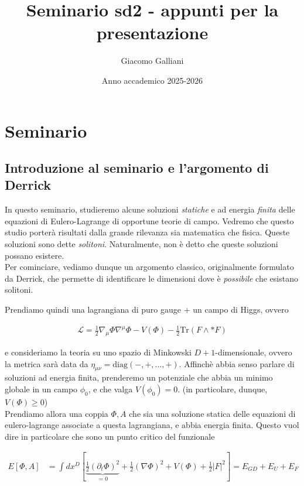 \documentclass{report}
\title{\Huge{\textbf{Seminario sd2 - appunti per la presentazione}}}
\author{Giacomo Galliani}
\date{Anno accademico 2025-2026}
\begin{document}
\maketitle
\newpage

\chapter{Seminario}

\section{Introduzione al seminario e l'argomento di Derrick}

In questo seminario, studieremo alcune soluzioni \emph{statiche} e ad energia \emph{finita} delle equazioni di Eulero-Lagrange di opportune teorie di campo. Vedremo che questo studio porterà risultati dalla grande rilevanza sia matematica che fisica. Queste soluzioni sono dette \emph{solitoni}. Naturalmente, non è detto che queste soluzioni possano esistere. \\

Per cominciare, vediamo dunque un argomento classico, originalmente formulato da Derrick, che permette di identificare le dimensioni dove è \emph{possibile} che esistano solitoni. 

Prendiamo quindi una lagrangiana di puro gauge + un campo di Higgs, ovvero 

\begin{align}
    \mathcal{L} = \frac{1}{2}\nabla_\mu \Phi \nabla^\mu \Phi - V(\Phi) - \frac{1}{2}\text{Tr}(F \wedge *F)
\end{align}

e consideriamo la teoria su uno spazio di Minkowski \(D+1\)-dimensionale, ovvero la metrica sarà data da \(\eta_{\mu\nu} = \text{diag}(-, +, \ldots, +)\). Affinchè abbia senso parlare di soluzioni ad energia finita, prenderemo un potenziale che abbia un minimo globale in un campo \(\phi_0\), e che valga \(V(\phi_0) = 0\). (in particolare, dunque, \(V(\Phi) \geq 0\))\\

Prendiamo allora una coppia \(\Phi, A\) che sia una soluzione statica delle equazioni di eulero-lagrange associate a questa lagrangiana, e abbia energia finita. Questo vuol dire in particolare che sono un punto critico del funzionale 

\begin{align}
    E [\Phi, A] &= \int dx^D \left[ \underbrace{\frac{1}{2}(\partial_t \Phi)^2}_{=0} + \frac{1}{2}(\nabla \Phi)^2 + V(\Phi) + \frac{1}{2}|F|^2\right] = E_{GD} + E_{U} + E_{F}
\end{align}
\end{document}
